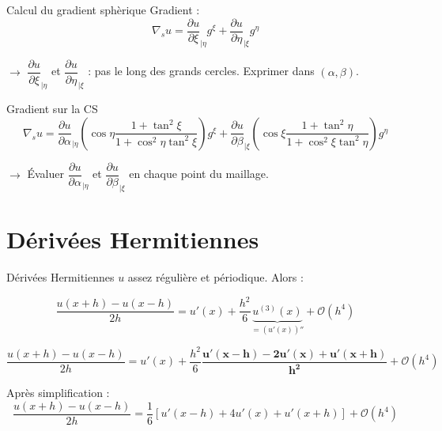 \documentclass[11pt]{beamer}
\begin{document}
\begin{frame}{Calcul du gradient sphèrique}
Gradient :
$$\nabla_s u = \dfrac{\partial u}{\partial \xi}_{|\eta} g^\xi + \dfrac{\partial u}{\partial \eta}_{|\xi} g^\eta $$

$\rightarrow$ $\dfrac{\partial u}{\partial \xi}_{|\eta}$ et $\dfrac{\partial u}{\partial \eta}_{|\xi}$ : pas le long des grands cercles. Exprimer dans $(\alpha, \beta)$.
\pause
\begin{block}{Gradient sur la CS}
$$\nabla_s u = \frac{\partial u}{\partial \alpha}_{|\eta} \left( \cos \eta \dfrac{1+ \tan^2 \xi}{1 + \cos^2 \eta \tan^2 \xi} \right) g^\xi + \frac{\partial u}{\partial \beta}_{|\xi} \left( \cos \xi \dfrac{1+ \tan^2 \eta}{1 + \cos^2 \xi \tan^2 \eta} \right) g^\eta $$
\end{block}
\pause
$\rightarrow$ Évaluer $\dfrac{\partial u}{\partial \alpha}_{|\eta}$ et $\dfrac{\partial u}{\partial \beta}_{|\xi}$ en chaque point du maillage.
\end{frame}


\section{Dérivées Hermitiennes}
\begin{frame}{Dérivées Hermitiennes}
$u$ assez régulière et périodique. Alors :

$$\dfrac{u(x+h)-u(x-h)}{2h} = u'(x) + \dfrac{h^2}{6} \underbrace{u^{(3)}(x)}_{= \left( u'(x) \right)''} + \mathcal{O}\left( h^4 \right)$$

\pause

$$\dfrac{u(x+h)-u(x-h)}{2h} = u'(x) + \dfrac{h^2}{6} \mathbf{ \dfrac{u'(x-h) - 2 u'(x) + u'(x+h) }{h^2}} + \mathcal{O}\left( h^4 \right)$$

\pause

\begin{block}{}
Après simplification :
$$\dfrac{u(x+h)-u(x-h)}{2h} = \dfrac{1}{6} \left[ u'(x-h) + 4 u'(x) + u'(x+h) \right] + \mathcal{O}\left( h^4 \right)$$
\end{block}
\end{frame}
\end{document}
